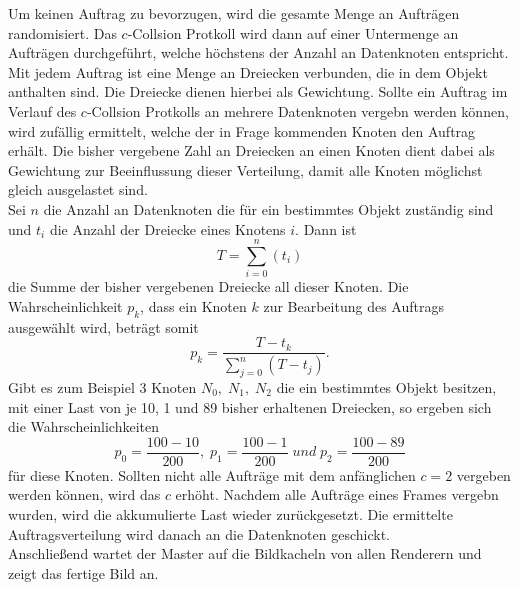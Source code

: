 Um keinen Auftrag zu bevorzugen, wird die gesamte Menge an Aufträgen randomisiert. Das $c$-Collsion Protkoll wird dann auf einer Untermenge an Aufträgen durchgeführt, welche höchstens der Anzahl an Datenknoten entspricht. Mit jedem Auftrag ist eine Menge an Dreiecken verbunden, die in dem Objekt anthalten sind. Die Dreiecke dienen hierbei als Gewichtung. Sollte ein Auftrag im Verlauf des $c$-Collsion Protkolls an mehrere Datenknoten vergebn werden können, wird zufällig ermittelt, welche der in Frage kommenden Knoten den Auftrag erhält. Die bisher vergebene Zahl an Dreiecken an einen Knoten dient dabei als Gewichtung zur Beeinflussung dieser Verteilung, damit alle Knoten möglichst gleich ausgelastet sind.\\
Sei $n$ die Anzahl an Datenknoten die für ein bestimmtes Objekt zuständig sind und $t_i$ die Anzahl der Dreiecke eines Knotens $i$. Dann ist
\[T=\sum_{i=0}^{n} \left(t_i\right)\]
die Summe der bisher vergebenen Dreiecke all dieser Knoten. Die Wahrscheinlichkeit $p_k$, dass ein Knoten $k$ zur Bearbeitung des Auftrags ausgewählt wird, beträgt somit 
  \[p_k=\frac{T-t_k}{\sum_{j=0}^{n} \left(T-t_j\right)}.\]
Gibt es zum Beispiel 3 Knoten $N_0,\; N_1,\; N_2$ die ein bestimmtes Objekt besitzen, mit einer Last von je 10, 1 und 89 bisher erhaltenen Dreiecken, so ergeben sich die Wahrscheinlichkeiten
\[p_0=\frac{100-10}{200}, \;p_1=\frac{100-1}{200}\; und \;p_2=\frac{100-89}{200}\]
für diese Knoten. Sollten nicht alle Aufträge mit dem anfänglichen $c=2$ vergeben werden können, wird das $c$ erhöht. Nachdem alle Aufträge eines Frames vergebn wurden, wird die akkumulierte Last wieder zurückgesetzt. Die ermittelte Auftragsverteilung wird danach an die Datenknoten geschickt.\\
Anschließend wartet der Master auf die Bildkacheln von allen Renderern und zeigt das fertige Bild an.

